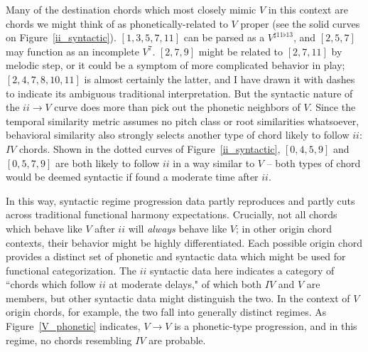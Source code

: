 Many of the destination chords which most closely mimic $V$ in this context are chords we might think of as phonetically-related to $V$ proper (see the solid curves on Figure~\ref{ii_syntactic}).  $[1,3,5,7,11]$ can be parsed as a $V^{\sharp 11 \flat 13}$, and $[2,5,7]$ may function as an incomplete $V^7$.  $[2,7,9]$ might be related to $[2,7,11]$ by melodic step, or it could be a symptom of more complicated behavior in play; $[2,4,7,8,10,11]$ is almost certainly the latter, and I have drawn it with dashes to indicate its ambiguous traditional interpretation.  But the syntactic nature of the $ii \rightarrow V$ curve does more than pick out the phonetic neighbors of $V$.  Since the temporal similarity metric assumes no pitch class or root similarities whatsoever, behavioral similarity also strongly selects another type of chord likely to follow $ii$: $IV$ chords.  Shown in the dotted curves of Figure~\ref{ii_syntactic}, $[0,4,5,9]$ and $[0,5,7,9]$ are both likely to follow $ii$ in a way similar to $V$ -- both types of chord would be deemed syntactic if found a moderate time after $ii$.

In this way, syntactic regime progression data partly reproduces and partly cuts across traditional functional harmony expectations.  Crucially, not all chords which behave like $V$ after $ii$ will \emph{always} behave like $V$; in other origin chord contexts, their behavior might be highly differentiated.  Each possible origin chord provides a distinct set of phonetic and syntactic data which might be used for functional categorization.  The $ii$ syntactic data here indicates a category of ``chords which follow $ii$ at moderate delays," of which both $IV$ and $V$ are members, but other syntactic data might distinguish the two.  In the context of $V$ origin chords, for example, the two fall into generally distinct regimes.  As Figure~\ref{V_phonetic} indicates, $V \rightarrow V$ is a phonetic-type progression, and in this regime, no chords resembling $IV$ are probable.

